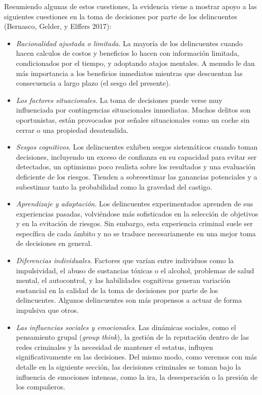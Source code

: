 \documentclass[
  spanish,
  letterpaper,
  DIV=11,
  numbers=noendperiod]{scrreprt}
\begin{document}
Resumiendo algunas de estos cuestiones, la evidencia viene a mostrar
apoyo a las siguientes cuestiones en la toma de decisiones por parte de
los delincuentes (Bernasco, Gelder, y Elffers 2017):

\begin{itemize}
\item
  \emph{Racionalidad ajustada o limitada}. La mayoría de los
  delincuentes cuando hacen calculos de costos y beneficios lo hacen con
  información limitada, condicionados por el tiempo, y adoptando atajos
  mentales. A menudo le dan más importancia a los beneficios inmediatos
  mientras que descuentan las consecuencia a largo plazo (el sesgo del
  presente).
\item
  \emph{Los factores situacionales}. La toma de decisiones puede verse
  muy influenciada por contingencias situacionales inmediatas. Muchos
  delitos son oportunistas, están provocados por señales situacionales
  como un coche sin cerrar o una propiedad desatendida.
\item
  \emph{Sesgos cognitivos}. Los delincuentes exhiben sesgos sistemáticos
  cuando toman decisiones, incluyendo un exceso de confianza en su
  capacidad para evitar ser detectados, un optimismo poco realista sobre
  los resultados y una evaluación deficiente de los riesgos. Tienden a
  sobreestimar las ganancias potenciales y a subestimar tanto la
  probabilidad como la gravedad del castigo.
\item
  \emph{Aprendizaje y adaptación}. Los delincuentes experimentados
  aprenden de sus experiencias pasadas, volviéndose más sofisticados en
  la selección de objetivos y en la evitación de riesgos. Sin embargo,
  esta experiencia criminal suele ser específica de cada ámbito y no se
  traduce necesariamente en una mejor toma de decisiones en general.
\item
  \emph{Diferencias individuales}. Factores que varían entre individuos
  como la impulsividad, el abuso de sustancias tóxicas o el alcohol,
  problemas de salud mental, el autocontrol, y las habilidades
  cognitivas generan variación sustancial en la calidad de la toma de
  decisiones por parte de los delincuentes. Algunos delincuentes son más
  propensos a actuar de forma impulsiva que otros.
\item
  \emph{Las influencias sociales y emocionales}. Las dinámicas sociales,
  como el pensamiento grupal (\emph{group think}), la gestión de la
  reputación dentro de las redes criminales y la necesidad de mantener
  el estatus, influyen significativamente en las decisiones. Del mismo
  modo, como veremos con más detalle en la siguiente sección, las
  decisiones criminales se toman bajo la influencia de emociones
  intensas, como la ira, la desesperación o la presión de los
  compañeros.
\end{itemize}
\end{document}
